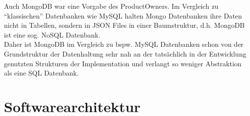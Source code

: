 \begin{table}[!h]
    \centering
    \end{table}

Auch MongoDB war eine Vorgabe des ProductOwners.
Im Vergleich zu “klassischen” Datenbanken wie MySQL halten Mongo Datenbanken ihre Daten nicht in Tabellen, sondern in JSON Files in einer Baumstruktur, d.h. MongoDB ist eine sog. NoSQL Datenbank. \\
Daher ist MongoDB im Vergleich zu bspw. MySQL Datenbanken schon von der Grundstruktur der Datenhaltung sehr nah an der tatsächlich in der Entwicklung genutzten Strukturen der Implementation und verlangt so weniger Abstraktion als eine SQL Datenbank.
\pagebreak
\section{Softwarearchitektur}

